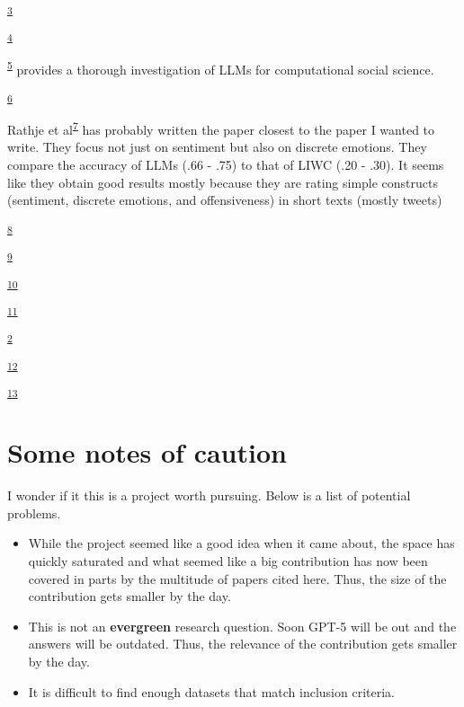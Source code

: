 \documentclass[
  10pt,
  twocolumn]{article}
\providecommand{\tightlist}{%
  \setlength{\itemsep}{0pt}\setlength{\parskip}{0pt}}\usepackage{longtable,booktabs,array}
\begin{document}
\textsuperscript{\protect\hyperlink{ref-kim}{3}}

\textsuperscript{\protect\hyperlink{ref-dillion2023}{4}}

\textsuperscript{\protect\hyperlink{ref-ziems}{5}} provides a thorough
investigation of LLMs for computational social science.

\textsuperscript{\protect\hyperlink{ref-sahu}{6}}

Rathje et al\textsuperscript{\protect\hyperlink{ref-rathje}{7}} has
probably written the paper closest to the paper I wanted to write. They
focus not just on sentiment but also on discrete emotions. They compare
the accuracy of LLMs (.66 - .75) to that of LIWC (.20 - .30). It seems
like they obtain good results mostly because they are rating simple
constructs (sentiment, discrete emotions, and offensiveness) in short
texts (mostly tweets)

\textsuperscript{\protect\hyperlink{ref-ding}{8}}

\textsuperscript{\protect\hyperlink{ref-liu}{9}}

\textsuperscript{\protect\hyperlink{ref-wang2021}{10}}

\textsuperscript{\protect\hyperlink{ref-gilardi}{11}}

\textsuperscript{\protect\hyperlink{ref-reiss}{2}}

\textsuperscript{\protect\hyperlink{ref-he}{12}}

\textsuperscript{\protect\hyperlink{ref-zhu}{13}}

\hypertarget{some-notes-of-caution}{%
\section{Some notes of caution}\label{some-notes-of-caution}}

I wonder if it this is a project worth pursuing. Below is a list of
potential problems.

\begin{itemize}
\tightlist
\item
  While the project seemed like a good idea when it came about, the
  space has quickly saturated and what seemed like a big contribution
  has now been covered in parts by the multitude of papers cited here.
  Thus, the size of the contribution gets smaller by the day.
\item
  This is not an \textbf{evergreen} research question. Soon GPT-5 will
  be out and the answers will be outdated. Thus, the relevance of the
  contribution gets smaller by the day.
\item
  It is difficult to find enough datasets that match inclusion criteria.
\end{itemize}
\end{document}
